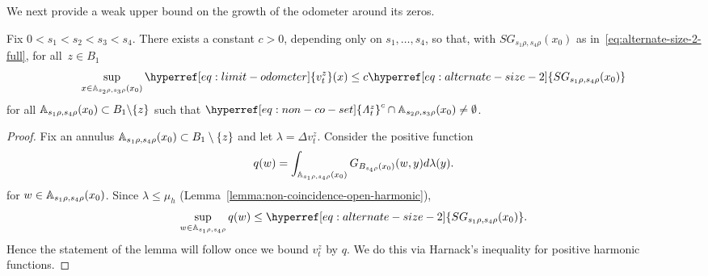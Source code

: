 \documentclass[12pt]{amsart}
\numberwithin{equation}{section}
\newcommand{\cluster}[2]{\hyperref[eq:non-co-set]{\mathit{\Lambda}^{#1}_{#2}}}
\newcommand{\odometer}[2]{\hyperref[eq:limit-odometer]{v^{#1}_{#2}}}
\newcommand{\SGrhofull}[4]{\hyperref[eq:alternate-size-2]{SG_{#3 #1, #4 #1}(#2)}}
\begin{document}
	
	We next provide a weak upper bound on the growth of the odometer around its zeros.  
	\begin{lemma} \label{lemma:odometer-bound-lqg-mass}
		Fix $0 < s_1  < s_2 < s_3 < s_4$. 
		There exists a constant $c > 0$, depending only on $s_1, \ldots, s_4$,  so that, with $\SGrhofull{\rho}{x_0}{s_1}{s_4}$ as in~\eqref{eq:alternate-size-2-full}, for all~$z \in B_1$
		\[
		\sup_{x \in \A_{s_2 \rho,s_3 \rho}(x_0)} \odometer{z}{t}(x) \leq c  \SGrhofull{\rho}{x_0}{s_1}{s_4}
		\]
		for all $\mathbb{A}_{s_1 \rho,s_4 \rho}(x_0) \subset B_1 \backslash \{z\}$ such that ${{{\cluster{z}{t}}}}^c \cap  \A_{s_2 \rho,s_3 \rho}(x_0) \neq \emptyset$. 
	\end{lemma}
	
	\begin{proof}
		Fix an annulus $\mathbb{A}_{s_1 \rho,s_4 \rho}(x_0) \subset B_1 \setminus \{z\}$ and let $\lambda = \Delta \odometer{z}{t}$.
		Consider the positive function  
		\[
		q(w) = \int_{\mathbb{A}_{s_1 \rho,s_4 \rho}(x_0)} G_{B_{s_4 \rho}(x_0)}(w,y) d \lambda(y).
		\]
		for $w \in \mathbb{A}_{s_1 \rho,s_4 \rho}(x_0)$.
		Since $\lambda \leq \mu_h$ (Lemma~\ref{lemma:non-coincidence-open-harmonic}), 
		\begin{equation} \label{eq:q-inequality} 
		\sup_{w \in \A_{s_1 \rho,s_4 \rho}} q(w) \leq \SGrhofull{\rho}{x_0}{s_1}{s_4}.
		\end{equation}
		Hence the statement of the lemma will follow once we bound $\odometer{z}{t}$ by $q$. We do this via Harnack's inequality for positive harmonic functions.
		

\end{proof}
\end{document}
